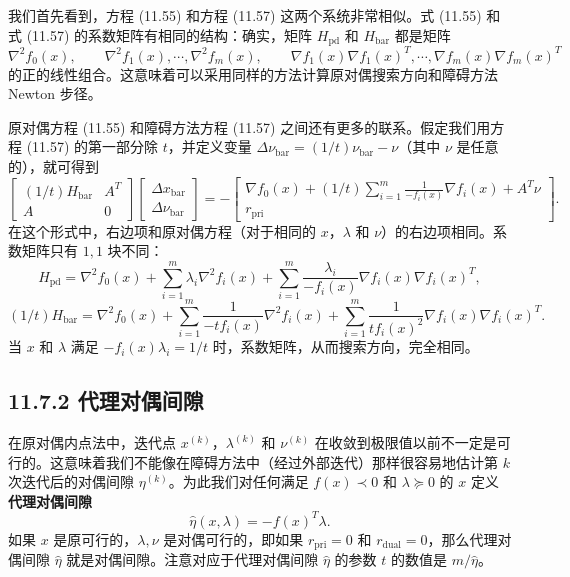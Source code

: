 \documentclass[UTF8,12pt,a4paper,fontset=fandol]{ctexart}
\begin{document}
我们首先看到，方程 (11.55) 和方程 (11.57) 这两个系统非常相似。式 (11.55) 和式 (11.57) 的系数矩阵有相同的结构：确实，矩阵 $H_{\mathrm{pd}}$ 和 $H_{\mathrm{bar}}$ 都是矩阵
\[
\nabla^2f_0(x),\qquad \nabla^2f_1(x),\cdots,\nabla^2f_m(x),\qquad
\nabla f_1(x)\nabla f_1(x)^T,\cdots,\nabla f_m(x)\nabla f_m(x)^T
\]
的正的线性组合。这意味着可以采用同样的方法计算原对偶搜索方向和障碍方法 Newton 步径。

原对偶方程 (11.55) 和障碍方法方程 (11.57) 之间还有更多的联系。假定我们用方程 (11.57) 的第一部分除 $t$，并定义变量 $\Delta\nu_{\mathrm{bar}}=(1/t)\nu_{\mathrm{bar}}-\nu$（其中 $\nu$ 是任意的），就可得到
\[
\begin{bmatrix}
(1/t)H_{\mathrm{bar}} & A^T\\
A & 0
\end{bmatrix}
\begin{bmatrix}
\Delta x_{\mathrm{bar}}\\
\Delta\nu_{\mathrm{bar}}
\end{bmatrix}
=-
\begin{bmatrix}
\nabla f_0(x)+(1/t)\sum_{i=1}^m\frac{1}{-f_i(x)}\nabla f_i(x)+A^T\nu\\
r_{\mathrm{pri}}
\end{bmatrix}.
\]
在这个形式中，右边项和原对偶方程（对于相同的 $x$，$\lambda$ 和 $\nu$）的右边项相同。系数矩阵只有 $1,1$ 块不同：
\[
H_{\mathrm{pd}}=\nabla^2f_0(x)+\sum_{i=1}^m\lambda_i\nabla^2f_i(x)+\sum_{i=1}^m\frac{\lambda_i}{-f_i(x)}\nabla f_i(x)\nabla f_i(x)^T,
\]
\[
(1/t)H_{\mathrm{bar}}=\nabla^2f_0(x)+\sum_{i=1}^m\frac{1}{-tf_i(x)}\nabla^2f_i(x)+\sum_{i=1}^m\frac{1}{tf_i(x)^2}\nabla f_i(x)\nabla f_i(x)^T.
\]
当 $x$ 和 $\lambda$ 满足 $-f_i(x)\lambda_i=1/t$ 时，系数矩阵，从而搜索方向，完全相同。

\subsection*{11.7.2 代理对偶间隙}

在原对偶内点法中，迭代点 $x^{(k)}$，$\lambda^{(k)}$ 和 $\nu^{(k)}$ 在收敛到极限值以前不一定是可行的。这意味着我们不能像在障碍方法中（经过外部迭代）那样很容易地估计第 $k$ 次迭代后的对偶间隙 $\eta^{(k)}$。为此我们对任何满足 $f(x)\prec 0$ 和 $\lambda\succeq 0$ 的 $x$ 定义\textbf{代理对偶间隙}
\begin{equation}
\hat{\eta}(x,\lambda)=-f(x)^T\lambda.
\tag{11.59}
\end{equation}
如果 $x$ 是原可行的，$\lambda,\nu$ 是对偶可行的，即如果 $r_{\mathrm{pri}}=0$ 和 $r_{\mathrm{dual}}=0$，那么代理对偶间隙 $\hat{\eta}$ 就是对偶间隙。注意对应于代理对偶间隙 $\hat{\eta}$ 的参数 $t$ 的数值是 $m/\hat{\eta}$。
\end{document}
